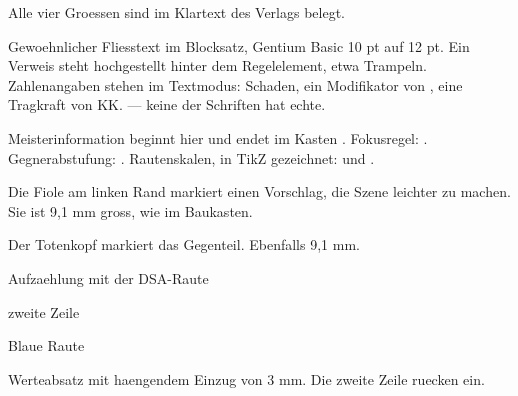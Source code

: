 \documentclass[raster,rasterzeigen]{dsa5latex}
\begin{document}
Alle vier Groessen sind im Klartext des Verlags belegt.


\clearpage





Gewoehnlicher Fliesstext im Blocksatz, Gentium Basic 10 pt auf 12 pt. Ein
Verweis steht hochgestellt hinter dem Regelelement, etwa
Trampeln. Zahlenangaben stehen im Textmodus:
 Schaden, ein Modifikator von , eine Tragkraft
von KK.  — keine der
Schriften hat echte.

Meisterinformation beginnt hier \dsaAugeSchwarz{} und endet im Kasten
\dsaAugeWeiss{}. Fokusregel: . Gegnerabstufung:
\dsaBauer{} \dsaSpringer{} \dsaTurm{} \dsaKoenig{}. Rautenskalen, in TikZ
gezeichnet:  und .

Die Fiole am linken Rand markiert einen Vorschlag, die Szene leichter zu
machen. Sie ist 9,1 mm gross, wie im Baukasten.

Der Totenkopf markiert das Gegenteil. Ebenfalls 9,1 mm.

\begin{dsaliste}
\item Aufzaehlung mit der DSA-Raute
\item zweite Zeile
\end{dsaliste}

\begin{dsalisteblau}
\item Blaue Raute
\end{dsalisteblau}

\begin{dsaWerteabsatz}
Werteabsatz mit haengendem Einzug von 3 mm. Die zweite Zeile ruecken ein.
\end{dsaWerteabsatz}
\end{document}
